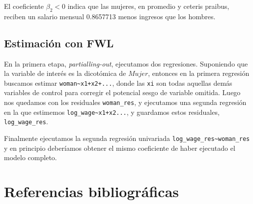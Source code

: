 \documentclass[
  11pt,
  letterpaper,
]{article}
\begin{document}
El coeficiente \(\beta_2<0\) indica que las mujeres, en promedio y
ceteris praibus, reciben un salario mensual 0.8657713 menos ingresos que
los hombres.

\hypertarget{estimaciuxf3n-con-fwl}{%
\subsection{Estimación con FWL}\label{estimaciuxf3n-con-fwl}}

En la primera etapa, \emph{partialling-out}, ejecutamos dos regresiones.
Suponiendo que la variable de interés es la dicotómica de \(Mujer\),
entonces en la primera regresión buscamos estimar
\texttt{woman\textasciitilde{}x1+x2+...}, donde las \texttt{xi} son
todas aquellas demás variables de control para corregir el potencial
sesgo de variable omitida. Luego nos quedamos con los residuales
\texttt{woman\_res}, y ejecutamos una segunda regresión en la que
estimemos \texttt{log\_wage\textasciitilde{}x1+x2...}, y guardamos estos
residuales, \texttt{log\_wage\_res}.

Finalmente ejecutamos la segunda regresión univariada
\texttt{log\_wage\_res\textasciitilde{}woman\_res} y en principio
deberíamos obtener el mismo coeficiente de haber ejecutado el modelo
completo.

\hypertarget{referencias-bibliogruxe1ficas}{%
\section{Referencias
bibliográficas}\label{referencias-bibliogruxe1ficas}}
\end{document}
